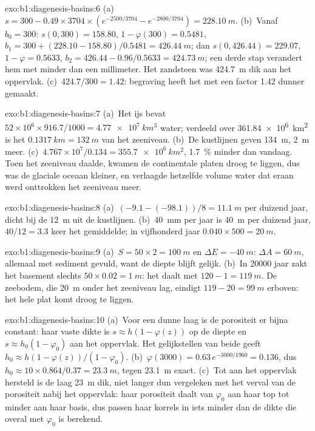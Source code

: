 \begin{solution}{exo:b1:diagenesis-basins:6}
(a)~$s = 300 - 0.49\times3704\times(e^{-2500/3704} - e^{-2800/3704}) =
\qty{228.10}{m}$. (b)~Vanaf $b_0 = 300$: $s(0, 300) = 158.80$, $1 - \varphi(300) =
0.5481$, $b_1 = 300 + (228.10 - 158.80)/0.5481 = \qty{426.44}{m}$; dan
$s(0, 426.44) = 229.07$, $1 - \varphi = 0.5633$, $b_2 = 426.44 - 0.96/0.5633 =
\qty{424.73}{m}$; een derde stap verandert hem met minder dan een millimeter. Het
zandsteen was \qty{424.7}{m} dik aan het oppervlak. (c)~$424.7/300 = 1.42$: begraving
heeft het met een factor \num{1.42} dunner gemaakt.
\end{solution}

\begin{solution}{exo:b1:diagenesis-basins:7}
(a)~Het ijs bevat $52\times10^6\times916.7/1000 = \qty{4.77e7}{km^3}$ water;
verdeeld over \qty{361.84e6}{km^2} is het $\qty{0.1317}{km} = \qty{132}{m}$ van het
zeeniveau. (b)~De kustlijnen geven \qty{134}{m}, \qty{2}{m} meer. (c)~$4.767\times
10^7/0.134 = \qty{355.7e6}{km^2}$, \qty{1.7}{\%} minder dan vandaag. Toen het zeeniveau
daalde, kwamen de continentale platen droog te liggen, dus was de glaciale oceaan kleiner, en
verlaagde hetzelfde volume water dat eraan werd onttrokken het zeeniveau meer.
\end{solution}

\begin{solution}{exo:b1:diagenesis-basins:8}
(a)~$(-9.1 - (-98.1))/8 = \qty{11.1}{m}$ per duizend jaar, dicht bij de
\qty{12}{m} uit de kustlijnen. (b)~\qty{40}{mm} per jaar is \qty{40}{m} per
duizend jaar, $40/12 = 3.3$ keer het gemiddelde; in vijfhonderd jaar
$0.040\times500 = \qty{20}{m}$.
\end{solution}

\begin{solution}{exo:b1:diagenesis-basins:9}
(a)~$S = 50\times2 = \qty{100}{m}$ en $\Delta E = \qty{-40}{m}$:
$\Delta A = \qty{60}{m}$, allemaal met sediment gevuld, want de diepte blijft gelijk.
(b)~In \num{20000} jaar zakt het basement slechts $50\times0.02 = \qty{1}{m}$:
het  daalt met $120 - 1 = \qty{119}{m}$. De zeebodem, die \qty{20}{m} onder het zeeniveau lag, eindigt
$119 - 20 = \qty{99}{m}$ erboven: het hele plat komt droog te liggen.
\end{solution}

\begin{solution}{exo:b1:diagenesis-basins:10}
(a)~Voor een dunne laag is de porositeit er bijna constant: haar vaste
dikte is $s \approx h(1 - \varphi(z))$ op de diepte en $s \approx h_0(1 -
\varphi_0)$ aan het oppervlak. Het gelijkstellen van beide geeft $h_0 \approx h(1 -
\varphi(z))/(1 - \varphi_0)$. (b)~$\varphi(3000) = 0.63\,e^{-3000/1960} =
0.136$, dus $h_0 \approx 10\times0.864/0.37 = \qty{23.3}{m}$, tegen
\qty{23.1}{m} exact. (c)~Tot aan het oppervlak hersteld is de laag
\qty{23}{m} dik, niet langer dun vergeleken met het verval van de porositeit nabij het
oppervlak: haar porositeit daalt van $\varphi_0$ aan haar top tot minder aan haar basis,
dus passen haar korrels in iets minder dan de dikte die overal met $\varphi_0$ is berekend.
\end{solution}

